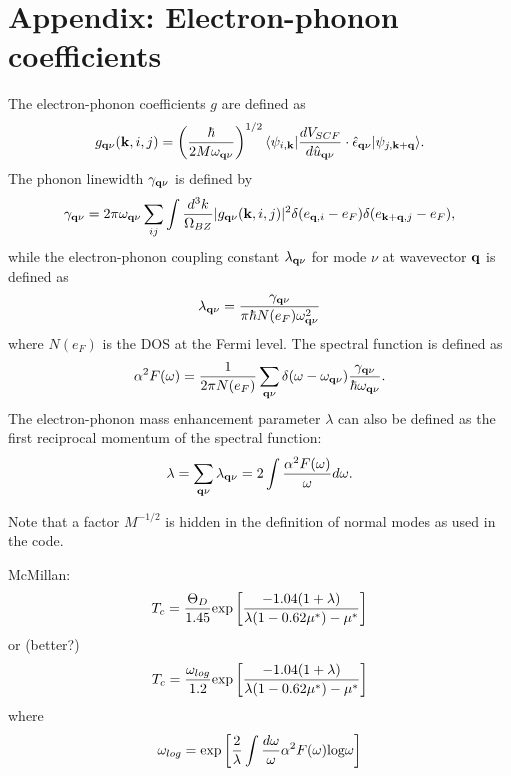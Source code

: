 \documentclass[12pt,a4paper]{article}
\begin{document}
\appendix
\section{Appendix: Electron-phonon coefficients}

\def\r{{\bf r}}
\def\d{{\bf d}}
\def\k{{\bf k}}
\def\q{{\bf q}}
\def\G{{\bf G}}
\def\R{{\bf R}}

\noindent The electron-phonon coefficients $g$
are defined as
\begin{equation}
g_{\q\nu}(\k,i,j) =\left({\hbar\over 2M\omega_{\q\nu}}\right)^{1/2}
\langle\psi_{i,\k}| {dV_{SCF}\over d {\hat u}_{\q\nu} }\cdot
                   \hat \epsilon_{\q\nu}|\psi_{j,\k+\q}\rangle.
\end{equation}
The phonon linewidth $\gamma_{\q\nu}$ is defined by
\begin{equation}
\gamma_{\q\nu} = 2\pi\omega_{\q\nu} \sum_{ij}
                \int {d^3k\over \Omega_{BZ}}  |g_{\q\nu}(\k,i,j)|^2
                    \delta(e_{\q,i} - e_F)  \delta(e_{\k+\q,j} - e_F), 
\end{equation}
while the electron-phonon coupling constant $\lambda_{\q\nu}$ for
mode $\nu$ at wavevector $\q$ is defined as
\begin{equation}
\lambda_{\q\nu} ={\gamma_{\q\nu} \over \pi\hbar N(e_F)\omega^2_{\q\nu}}
\end{equation}
where $N(e_F)$ is the DOS at the Fermi level.
The spectral function is defined as
\begin{equation}
\alpha^2F(\omega) = {1\over 2\pi N(e_F)}\sum_{\q\nu} 
                    \delta(\omega-\omega_{\q\nu})
                    {\gamma_{\q\nu}\over\hbar\omega_{\q\nu}}.
\end{equation}
The electron-phonon mass enhancement parameter $\lambda$
can also be defined as the first reciprocal momentum of 
the spectral function:
\begin{equation}
\lambda = \sum_{\q\nu} \lambda_{\q\nu} = 
2 \int {\alpha^2F(\omega) \over \omega} d\omega.
\end{equation}

Note that a factor $M^{-1/2}$ is hidden in the definition of
normal modes as used in the code.

McMillan:
\begin{equation}
T_c = {\Theta_D \over 1.45} \mbox{exp} \left [ 
         {-1.04(1+\lambda)\over \lambda(1-0.62\mu^*)-\mu^*}\right ]
\end{equation}
or (better?)
\begin{equation}
T_c = {\omega_{log}\over 1.2} \mbox{exp} \left [ 
         {-1.04(1+\lambda)\over \lambda(1-0.62\mu^*)-\mu^*}\right ]
\end{equation}
where
\begin{equation}
\omega_{log} = \mbox{exp} \left [ {2\over\lambda} \int {d\omega\over\omega}
                                  \alpha^2F(\omega) \mbox{log}\omega \right ]
\end{equation}
\end{document}
